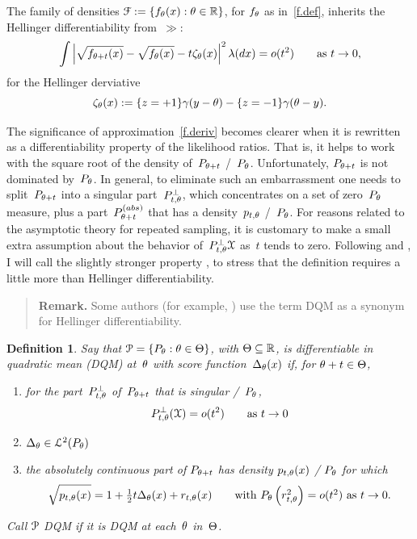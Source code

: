\documentclass[aos]{imsart}
\theoremstyle{plain}
\newtheorem{definition}[equation]{Definition}
\theoremstyle{remark}
\newenvironment{remark}{\begin{quote}{\bf Remark.\quad}\rm\small}{\end{quote}}
\def\Remark{\begin{remark}}
\def\endRemark{\end{remark}}
\begin{document}
The family of densities ${\EuScript F}:=\{f_\theta(x): \theta \in{\mathbb R}\}$, for $f_\theta$ as in~\cref{f.def}, inherits
the Hellinger differentiability from~$\gg$:
\begin{equation}
\int\left|\sqrt{f_{\theta+t}(x)} -\sqrt{f_{\theta}(x)} - t\zeta_\theta(x)\right|^2
\lambda(dx)  = o(t^2)
\qquad\hbox{\rm as $t\to 0$},
\label{f.deriv}
\end{equation}
for the Hellinger derviative
$$
\zeta_\theta(x) := \{z= +1\}\gamma(y-\theta) -\{z= -1\}\gamma(\theta-y).
$$

The significance of approximation~\cref{f.deriv}  becomes clearer when it is rewritten as a differentiability property of the likelihood ratios.
That is, it helps to work with the square root of the density
of~$P_{\theta+t}$ \wrt/~$P_\theta$. Unfortunately, $P_{\theta+t}$ is not
dominated by~$P_\theta$. In general, to eliminate such an embarrassment
one needs to split~$P_{\theta+t}$ into a singular part~$P^\bot_{t,\theta}$,
which concentrates on a set of zero~$P_\theta$ measure, plus a part~$P_{\theta+t}^{(abs)}$ that
has a density~$p_{t,\theta}$ \wrt/~$P_\theta$. For reasons related to the
asymptotic theory for repeated sampling, it is customary to make a
small extra assumption about the behavior of~$P^\bot_{t,\theta}{\EuScript X}$
as~$t$ tends to zero. Following \citet[Section~17.3]{LeCam:86book} and
\citet[Section~7.2]{LeCam:Yang:2000book}, I will call the slightly
stronger property ,
to stress that the definition requires a little more than Hellinger
differentiability. 

\Remark 
Some authors (for example,
\citealt[page~457]{BKRW:93book}) use the term DQM as a synonym for
Hellinger differentiability.
\endRemark 

\begin{definition}	\label{dqm.def}
Say that ${\EuScript P}=\{P_\theta:\theta \in \Theta\}$, with $\Theta\subseteq{\mathbb R}$, is differentiable in quadratic mean (DQM) at~$\theta$ with score function~$\Delta_\theta(x)$
  if, for $\theta+t\in\Theta$,
\begin{enumerate} 
\item
for the part~$P^\bot_{t,\theta}$ of~$P_{\theta+t}$ that is singular \wrt/~$P_\theta$,
$$
P^\bot_{t,\theta}({\EuScript X})=o(t^2) 
\qquad\hbox{\rm as $t\to0$}
$$

\item
$\Delta_\theta\in{\EuScript L}^2(P_\theta)$  

\item
the absolutely continuous part of $P_{\theta+t}$ 
has density $p_{t,\theta}(x)$ \wrt/ $P_\theta$ for which
$$
\sqrt{p_{t,\theta}(x)} = 1 + \tfrac12 t \Delta_\theta(x) + r_{t,\theta}(x)
\qquad\hbox{\rm with $P_\theta \left(r_{t,\theta}^2\right) =
o(t^2)$ as $t\to0$}.
$$
\end{enumerate} 
Call ${\EuScript P}$  DQM if it is DQM at each~$\theta$ in~$\Theta$.
\end{definition}
\end{document}
